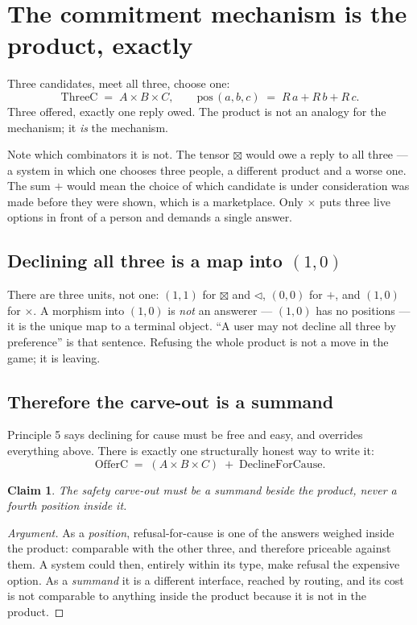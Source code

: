 \documentclass[11pt,a4paper]{article}
\newtheorem*{claim}{Claim}
\newcommand{\seq}{\mathbin{\triangleleft}}
\newcommand{\ten}{\mathbin{\boxtimes}}
\begin{document}
\section{The commitment mechanism is the product, exactly}
\label{sec:commit}

Three candidates, meet all three, choose one:
\[
  \mathrm{ThreeC} \;=\; A \times B \times C,
  \qquad
  \mathrm{pos}\,(a,b,c) \;=\; R\,a + R\,b + R\,c.
\]
Three offered, exactly one reply owed. The product is not an analogy for the
mechanism; it \emph{is} the mechanism.

Note which combinators it is not. The tensor $\ten$ would owe a reply to all
three --- a system in which one chooses three people, a different product and a
worse one. The sum $+$ would mean the choice of which candidate is under
consideration was made before they were shown, which is a marketplace. Only
$\times$ puts three live options in front of a person and demands a single
answer.

\subsection{Declining all three is a map into $(1,0)$}

There are three units, not one: $(1,1)$ for $\ten$ and $\seq$, $(0,0)$ for $+$,
and $(1,0)$ for $\times$. A morphism into $(1,0)$ is \emph{not} an answerer ---
$(1,0)$ has no positions --- it is the unique map to a terminal object. ``A user
may not decline all three by preference'' is that sentence. Refusing the whole
product is not a move in the game; it is leaving.

\subsection{Therefore the carve-out is a summand}

Principle 5 says declining for cause must be free and easy, and overrides
everything above. There is exactly one structurally honest way to write it:
\[
  \mathrm{OfferC} \;=\; (A \times B \times C) \;+\; \mathrm{DeclineForCause}.
\]

\begin{claim}
The safety carve-out must be a summand beside the product, never a fourth
position inside it.
\end{claim}

\begin{proof}[Argument]
As a \emph{position}, refusal-for-cause is one of the answers weighed inside the
product: comparable with the other three, and therefore priceable against them.
A system could then, entirely within its type, make refusal the expensive option.
As a \emph{summand} it is a different interface, reached by routing, and its cost
is not comparable to anything inside the product because it is not in the
product.
\end{proof}
\end{document}
